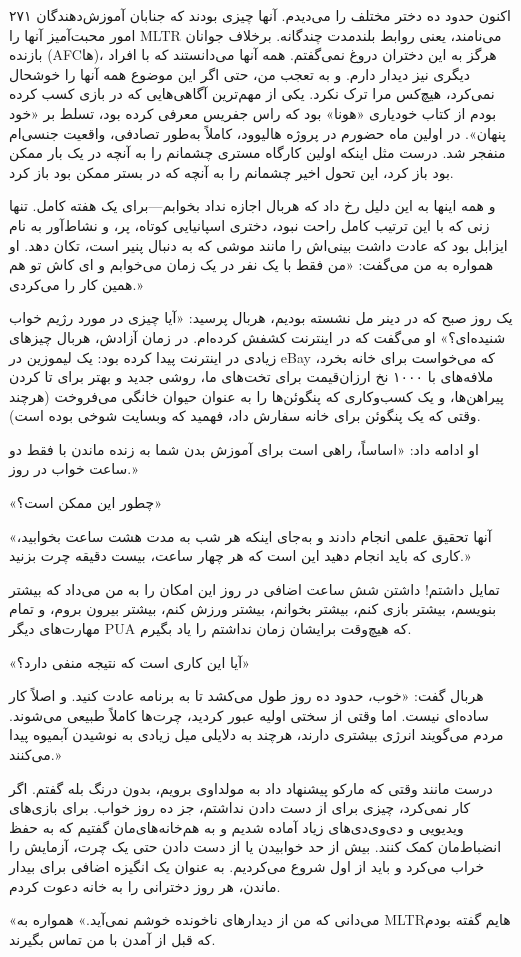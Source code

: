۲۷۱  
اکنون حدود ده دختر مختلف را می‌دیدم. آنها چیزی بودند که جنابان آموزش‌دهندگان امور محبت‌آمیز آنها را MLTR می‌نامند، یعنی روابط بلندمدت چندگانه. برخلاف جوانان بازنده (AFCها)، هرگز به این دختران دروغ نمی‌گفتم. همه آنها می‌دانستند که با افراد دیگری نیز دیدار دارم. و به تعجب من، حتی اگر این موضوع همه آنها را خوشحال نمی‌کرد، هیچ‌کس مرا ترک نکرد. یکی از مهم‌ترین آگاهی‌هایی که در بازی کسب کرده بودم از کتاب خودیاری «هونا» بود که راس جفریس معرفی کرده بود، تسلط بر «خود پنهان». در اولین ماه حضورم در پروژه هالیوود، کاملاً به‌طور تصادفی، واقعیت جنسی‌ام منفجر شد. درست مثل اینکه اولین کارگاه مستری چشمانم را به آنچه در یک بار ممکن بود باز کرد، این تحول اخیر چشمانم را به آنچه که در بستر ممکن بود باز کرد. 

و همه اینها به این دلیل رخ داد که هربال اجازه نداد بخوابم—برای یک هفته کامل. تنها زنی که با این ترتیب کامل راحت نبود، دختری اسپانیایی کوتاه، پر، و نشاط‌آور به نام ایزابل بود که عادت داشت بینی‌اش را مانند موشی که به دنبال پنیر است، تکان دهد. او همواره به من می‌گفت: «من فقط با یک نفر در یک زمان می‌خوابم و ای کاش تو هم همین کار را می‌کردی.» 

یک روز صبح که در دینر مل نشسته بودیم، هربال پرسید: «آیا چیزی در مورد رژیم خواب شنیده‌ای؟» او می‌گفت که در اینترنت کشفش کرده‌ام. در زمان آزادش، هربال چیزهای زیادی در اینترنت پیدا کرده بود: یک لیموزین در eBay که می‌خواست برای خانه بخرد، ملافه‌های با ۱۰۰۰ نخ ارزان‌قیمت برای تخت‌های ما، روشی جدید و بهتر برای تا کردن پیراهن‌ها، و یک کسب‌وکاری که پنگوئن‌ها را به عنوان حیوان خانگی می‌فروخت (هرچند وقتی که یک پنگوئن برای خانه سفارش داد، فهمید که وبسایت شوخی بوده است).

او ادامه داد: «اساساً، راهی است برای آموزش بدن شما به زنده ماندن با فقط دو ساعت خواب در روز.» 

«چطور این ممکن است؟» 

«آنها تحقیق علمی انجام دادند و به‌جای اینکه هر شب به مدت هشت ساعت بخوابید، کاری که باید انجام دهید این است که هر چهار ساعت، بیست دقیقه چرت بزنید.» 

تمایل داشتم! داشتن شش ساعت اضافی در روز این امکان را به من می‌داد که بیشتر بنویسم، بیشتر بازی کنم، بیشتر بخوانم، بیشتر ورزش کنم، بیشتر بیرون بروم، و تمام مهارت‌های دیگر PUA که هیچ‌وقت برایشان زمان نداشتم را یاد بگیرم.

«آیا این کاری است که نتیجه منفی دارد؟» 

هربال گفت: «خوب، حدود ده روز طول می‌کشد تا به برنامه عادت کنید. و اصلاً کار ساده‌ای نیست. اما وقتی از سختی اولیه عبور کردید، چرت‌ها کاملاً طبیعی می‌شوند. مردم می‌گویند انرژی بیشتری دارند، هرچند به دلایلی میل زیادی به نوشیدن آبمیوه پیدا می‌کنند.»

درست مانند وقتی که مارکو پیشنهاد داد به مولداوی برویم، بدون درنگ بله گفتم. اگر کار نمی‌کرد، چیزی برای از دست دادن نداشتم، جز ده روز خواب. برای بازی‌های ویدیویی و دی‌وی‌دی‌های زیاد آماده شدیم و به هم‌خانه‌های‌مان گفتیم که به حفظ انضباط‌مان کمک کنند. بیش از حد خوابیدن یا از دست دادن حتی یک چرت، آزمایش را خراب می‌کرد و باید از اول شروع می‌کردیم. به عنوان یک انگیزه اضافی برای بیدار ماندن، هر روز دخترانی را به خانه دعوت کردم.

«می‌دانی که من از دیدارهای ناخونده خوشم نمی‌آید.» همواره به MLTRهایم گفته بودم که قبل از آمدن با من تماس بگیرند.